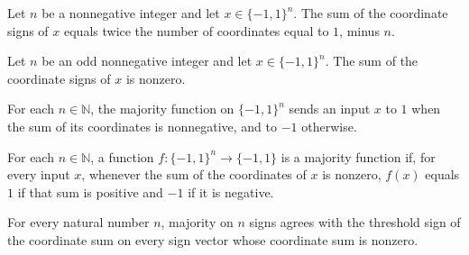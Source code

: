 \begin{theorem}
\label{FABL.sum_signValue_eq_two_mul_positiveCoordinateCount_sub}
\leanok
{}
Let $n$ be a nonnegative integer and let $x\in\{-1,1\}^n$. The sum of the coordinate
signs of $x$ equals twice the number of coordinates equal to $1$, minus $n$.
\end{theorem}

\begin{theorem}
\label{FABL.sum_signValue_ne_zero_of_odd}
\leanok
{}
Let $n$ be an odd nonnegative integer and let $x\in\{-1,1\}^n$. The sum of the
coordinate signs of $x$ is nonzero.
\end{theorem}

\begin{definition}
\label{FABL.majority}
\leanok
{}
For each $n\in\mathbb N$, the majority function on $\{-1,1\}^n$ sends an input $x$ to
$1$ when the sum of its coordinates is nonnegative, and to $-1$ otherwise.
\end{definition}

\begin{definition}
\label{FABL.IsMajorityFunction}
\leanok
{}
For each $n\in\mathbb N$, a function $f:\{-1,1\}^n\to\{-1,1\}$ is a majority function
if, for every input $x$, whenever the sum of the coordinates of $x$ is nonzero, $f(x)$
equals $1$ if that sum is positive and $-1$ if it is negative.
\end{definition}

\begin{theorem}
\label{FABL.majority_isMajorityFunction}
\leanok
{}
For every natural number $n$, majority on $n$ signs agrees with the threshold sign of
the coordinate sum on every sign vector whose coordinate sum is nonzero.
\end{theorem}

